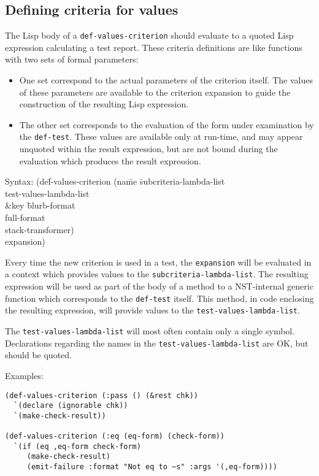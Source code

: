 \subsection{Defining criteria for values}
The Lisp body of a \texttt{def-values-criterion} should evaluate to a
quoted Lisp expression calculating a test report.  These criteria
definitions are like functions with two sets of formal parameters:
\begin{itemize}
\item One set correspond to the actual parameters of the criterion
  itself.  The values of these parameters are available to the
  criterion expansion to guide the construction of the resulting Lisp
  expression.
\item The other set corresponds to the evaluation of the form under
  examination by the \texttt{def-test}.  These values are available
  only at run-time, and may appear unquoted within the result
  expression, but are not bound during the evaluation which produces
  the result expression.
\end{itemize}
% 
{\ttfamily\begin{tabbing}
\textrm{Syntax: 
}(de\=f-values-criterion (na\=me \=subcriteria-lambda-list
\\ \> \> \> test-values-lambda-list
\\ \> \> \&key \= blurb-format
\\ \> \>        \> full-format
\\ \> \>        \> stack-transformer)
\\ \> expansion)
\end{tabbing}}
%
Every time the new criterion is used in a test, the \texttt{expansion}
will be evaluated in a context which provides values to the
\texttt{subcriteria-lambda-list}.  The resulting expression will be
used as part of the body of a method to a NST-internal generic
function which corresponds to the \texttt{def-test} itself.  This
method, in code enclosing the resulting expression, will provide
values to the \texttt{test-values-lambda-list}.

The \texttt{test-values-lambda-list} will most often contain only a
single symbol.  Declarations regarding the names in the
\texttt{test-values-lambda-list} are OK, but should be quoted.

Examples:
\begin{verbatim}
(def-values-criterion (:pass () (&rest chk))
  `(declare (ignorable chk))
  `(make-check-result))

(def-values-criterion (:eq (eq-form) (check-form))
  `(if (eq ,eq-form check-form)
     (make-check-result)
     (emit-failure :format "Not eq to ~s" :args '(,eq-form))))
\end{verbatim}

